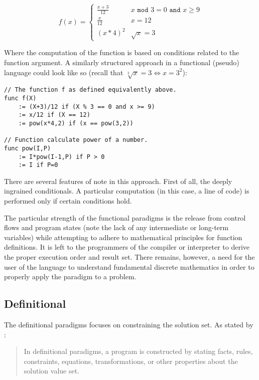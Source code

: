 \[
f(x) =
\begin{cases} \frac{x+3}{12} & x \texttt{ mod } 3 = 0 \texttt{ and } x \geq 9
\\
\frac{x}{12} & x = 12
\\
(x * 4)^2 & \sqrt{x} = 3
\end{cases}
\]

Where the computation of the function is based on conditions related to the function argument. A similarly structured approach in a functional (pseudo) language could look like so (recall that $\sqrt[2]{x} = 3 \Leftrightarrow x = 3^2$):

\begin{lstlisting}[caption={Pseudocode example in a functional style.},label={lst:paradigm_functional}]
// The function f as defined equivalently above.
func f(X)
	:= (X+3)/12 if (X % 3 == 0 and x >= 9)
	:= x/12 if (X == 12)
	:= pow(x*4,2) if (x == pow(3,2))

// Function calculate power of a number.
func pow(I,P)
	:= I*pow(I-1,P) if P > 0
	:= I if P=0
\end{lstlisting}

There are several features of note in this approach. First of all, the deeply ingrained conditionals. A particular computation (in this case, a line of code) is performed only if certain conditions hold. 

The particular strength of the functional paradigms is the release from control flows and program states (note the lack of any intermediate or long-term variables) while attempting to adhere to mathematical principles for function definitions. It is left to the programmers of the compiler or interpreter to derive the proper execution order and result set. There remains, however, a need for the user of the language to understand fundamental discrete mathematics in order to properly apply the paradigm to a problem.

\subsection{Definitional}
The definitional paradigms focuses on constraining the solution set. As stated by \citep{paradigms1992}:

\begin{quote}
In definitional paradigms, a program is constructed by stating facts, rules, constraints, equations, transformations, or other properties about the solution value set.
\end{quote}

